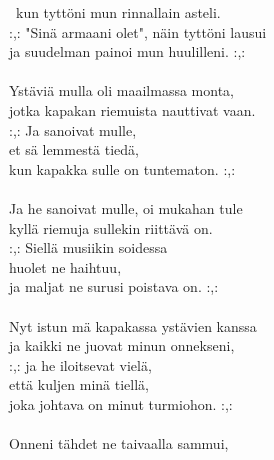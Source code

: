 \ kun tyttöni mun rinnallain asteli. \\ :,: "Sinä armaani olet", näin tyttöni lausui \\ ja suudelman painoi mun huulilleni. :,: \\ \hspace{10mm} \\ Ystäviä mulla oli maailmassa monta, \\ jotka kapakan riemuista nauttivat vaan. \\ :,: Ja sanoivat mulle, \\ et sä lemmestä tiedä, \\ kun kapakka sulle on tuntematon. :,: \\ \hspace{10mm} \\ Ja he sanoivat mulle, oi mukahan tule \\ kyllä riemuja sullekin riittävä on. \\ :,: Siellä musiikin soidessa  \\ huolet ne haihtuu, \\ ja maljat ne surusi poistava on. :,: \\ \hspace{10mm} \\ Nyt istun mä kapakassa ystävien kanssa \\ ja kaikki ne juovat minun onnekseni, \\ :,: ja he iloitsevat vielä, \\ että kuljen minä tiellä, \\ joka johtava on minut turmiohon. :,: \\ \hspace{10mm} \\ Onneni tähdet ne taivaalla sammui, \\ 
